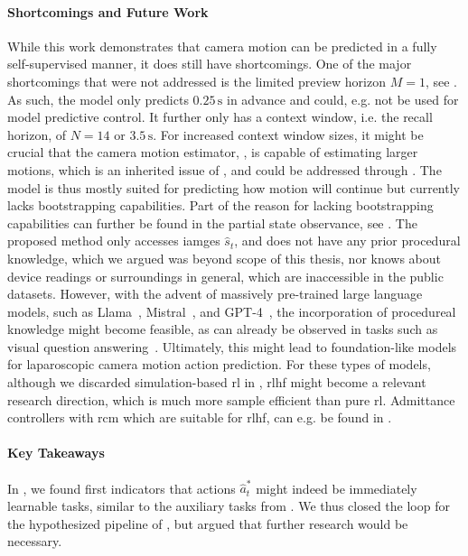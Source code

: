 \paragraph{Shortcomings and Future Work}
While this work demonstrates that camera motion can be predicted in a fully self-supervised manner, it does still have shortcomings. One of the major shortcomings that were not addressed is the limited preview horizon $M=1$, see . As such, the model only predicts $0.25\,\text{s}$ in advance and could, e.g. not be used for model predictive control. It further only has a context window, i.e. the recall horizon, of $N=14$ or $3.5\,\text{s}$. For increased context window sizes, it might be crucial that the camera motion estimator, , is capable of estimating larger motions, which is an inherited issue of , and could be addressed through . The model is thus mostly suited for predicting how motion will continue but currently lacks bootstrapping capabilities. Part of the reason for lacking bootstrapping capabilities can further be found in the partial state observance, see . The proposed method only accesses iamges $\hat{s}_t$, and does not have any prior procedural knowledge, which we argued was beyond scope of this thesis, nor knows about device readings or surroundings in general, which are inaccessible in the public datasets. However, with the advent of massively pre-trained large language models, such as Llama~\cite{touvron2023llama}, Mistral~\cite{jiang2023mistral}, and GPT-4~\cite{achiam2023gpt}, the incorporation of procedureal knowledge might become feasible, as can already be observed in tasks such as visual question answering~\cite{seenivasan2022surgical}. Ultimately, this might lead to foundation-like models for laparoscopic camera motion action prediction. For these types of models, although we discarded simulation-based \gls{rl} in , \gls{rlhf} might become a relevant research direction, which is much more sample efficient than pure \gls{rl}. Admittance controllers with \gls{rcm} which are suitable for \gls{rlhf}, can e.g. be found in .

\paragraph{Key Takeaways}
In , we found first indicators that actions $\hat{a}^*_t$ might indeed be immediately learnable tasks, similar to the auxiliary tasks from . We thus closed the loop for the hypothesized pipeline of , but argued that further research would be necessary.

